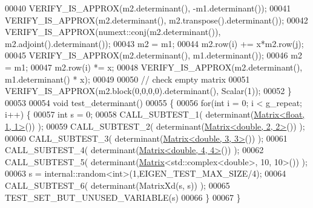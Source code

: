 \begin{DoxyCode}
00040   VERIFY\_IS\_APPROX(m2.determinant(), -m1.determinant());
00041   VERIFY\_IS\_APPROX(m2.determinant(), m2.transpose().determinant());
00042   VERIFY\_IS\_APPROX(numext::conj(m2.determinant()), m2.adjoint().determinant());
00043   m2 = m1;
00044   m2.row(i) += x*m2.row(j);
00045   VERIFY\_IS\_APPROX(m2.determinant(), m1.determinant());
00046   m2 = m1;
00047   m2.row(i) *= x;
00048   VERIFY\_IS\_APPROX(m2.determinant(), m1.determinant() * x);
00049   
00050   \textcolor{comment}{// check empty matrix}
00051   VERIFY\_IS\_APPROX(m2.block(0,0,0,0).determinant(), Scalar(1));
00052 \}
00053 
00054 \textcolor{keywordtype}{void} test\_determinant()
00055 \{
00056   \textcolor{keywordflow}{for}(\textcolor{keywordtype}{int} i = 0; i < g\_repeat; i++) \{
00057     \textcolor{keywordtype}{int} s = 0;
00058     CALL\_SUBTEST\_1( determinant(\hyperlink{group___core___module_class_eigen_1_1_matrix}{Matrix<float, 1, 1>}()) );
00059     CALL\_SUBTEST\_2( determinant(\hyperlink{group___core___module_class_eigen_1_1_matrix}{Matrix<double, 2, 2>}()) );
00060     CALL\_SUBTEST\_3( determinant(\hyperlink{group___core___module_class_eigen_1_1_matrix}{Matrix<double, 3, 3>}()) );
00061     CALL\_SUBTEST\_4( determinant(\hyperlink{group___core___module_class_eigen_1_1_matrix}{Matrix<double, 4, 4>}()) );
00062     CALL\_SUBTEST\_5( determinant(\hyperlink{group___core___module_class_eigen_1_1_matrix}{Matrix}<std::complex<double>, 10, 10>()) );
00063     s = internal::random<int>(1,EIGEN\_TEST\_MAX\_SIZE/4);
00064     CALL\_SUBTEST\_6( determinant(MatrixXd(s, s)) );
00065     TEST\_SET\_BUT\_UNUSED\_VARIABLE(s)
00066   \}
00067 \}
\end{DoxyCode}
